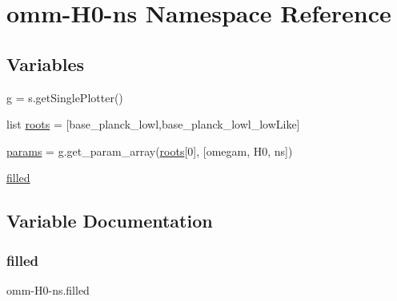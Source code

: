 \hypertarget{namespaceomm-H0-ns}{}\section{omm-\/\+H0-\/ns Namespace Reference}
\label{namespaceomm-H0-ns}
\subsection*{Variables}
\begin{DoxyCompactItemize}
\item 
\mbox{\hyperlink{namespaceomm-H0-ns_a9c190517e0bb271ea74c52de561029ae}{g}} = s.\+get\+Single\+Plotter()
\item 
list \mbox{\hyperlink{namespaceomm-H0-ns_ada743c36e65bde6d6e4ca0ae0cf1bbbe}{roots}} = \mbox{[}\textquotesingle{}base\+\_\+planck\+\_\+lowl\textquotesingle{},\textquotesingle{}base\+\_\+planck\+\_\+lowl\+\_\+low\+Like\textquotesingle{}\mbox{]}
\item 
\mbox{\hyperlink{namespaceomm-H0-ns_a279cdba8cd2ded2eea0d11344dfa2596}{params}} = g.\+get\+\_\+param\+\_\+array(\mbox{\hyperlink{namespaceomm-H0-ns_ada743c36e65bde6d6e4ca0ae0cf1bbbe}{roots}}\mbox{[}0\mbox{]}, \mbox{[}\textquotesingle{}omegam\textquotesingle{}, \textquotesingle{}H0\textquotesingle{}, \textquotesingle{}ns\textquotesingle{}\mbox{]})
\item 
\mbox{\hyperlink{namespaceomm-H0-ns_a793225134a37fd8e80e2a50e58f9c5c3}{filled}}
\end{DoxyCompactItemize}


\subsection{Variable Documentation}
\mbox{\label{namespaceomm-H0-ns_a793225134a37fd8e80e2a50e58f9c5c3}} 
\subsubsection{\texorpdfstring{filled}{filled}}
{\footnotesize\ttfamily omm-\/H0-\/ns.\+filled}

\mbox{\label{namespaceomm-H0-ns_a9c190517e0bb271ea74c52de561029ae}} 
